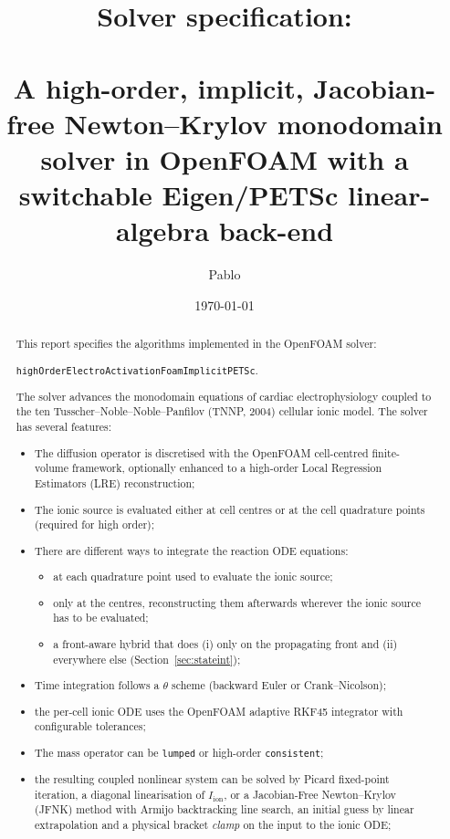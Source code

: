 \documentclass[11pt,a4paper]{article}
\title{Solver specification:\\
       \texorpdfstring{\code{highOrderElectroActivationFoamImplicitPETSc}}{highOrderElectroActivationFoamImplicitPETSc}\\
       \large A high-order, implicit, Jacobian-free Newton--Krylov monodomain
       solver in OpenFOAM with a switchable Eigen/PETSc linear-algebra
       back-end}
\author{Pablo}
\date{\today}
\newcommand{\code}[1]{\texttt{\small #1}}
\newcommand{\Iion}{I_{\mathrm{ion}}}
\begin{document}
\maketitle

\begin{abstract}
This report specifies the algorithms implemented in the OpenFOAM solver:

\begin{center}
\code{highOrderElectroActivationFoamImplicitPETSc}.
\end{center}

The solver advances the monodomain equations
of cardiac electrophysiology coupled to the
ten Tusscher--Noble--Noble--Panfilov (TNNP, 2004) cellular ionic model. The solver
has several features:
\begin{itemize}
\item The diffusion operator is
discretised with the OpenFOAM cell-centred finite-volume framework,
optionally enhanced to a high-order Local
Regression Estimators (LRE) reconstruction;
\item The ionic source is evaluated either at cell
centres or at the cell quadrature points (required for high order);
\item There are different ways to integrate the reaction ODE equations:
\begin{itemize}
\item[(i)] at each quadrature point used to evaluate the ionic source;
\item[(ii)] only at the centres, reconstructing them afterwards wherever the ionic source has to be evaluated;
\item[(iii)] a front-aware hybrid that does (i) only on the propagating front and (ii) everywhere else (Section~\ref{sec:stateint});
\end{itemize}
\item Time integration follows a $\theta$ scheme (backward Euler or Crank--Nicolson);
\item the per-cell ionic
ODE uses the OpenFOAM adaptive RKF45 integrator with configurable
tolerances;
\item The mass operator can be \code{lumped} or high-order \code{consistent};
\item the resulting coupled nonlinear system can be solved by Picard fixed-point
iteration, a diagonal linearisation of $\Iion$, or a Jacobian-Free
Newton--Krylov (JFNK) method with Armijo backtracking line search,
an initial guess by linear extrapolation and a physical bracket \emph{clamp}
on the input to the ionic ODE;

\end{itemize}
\end{abstract}
\end{document}
